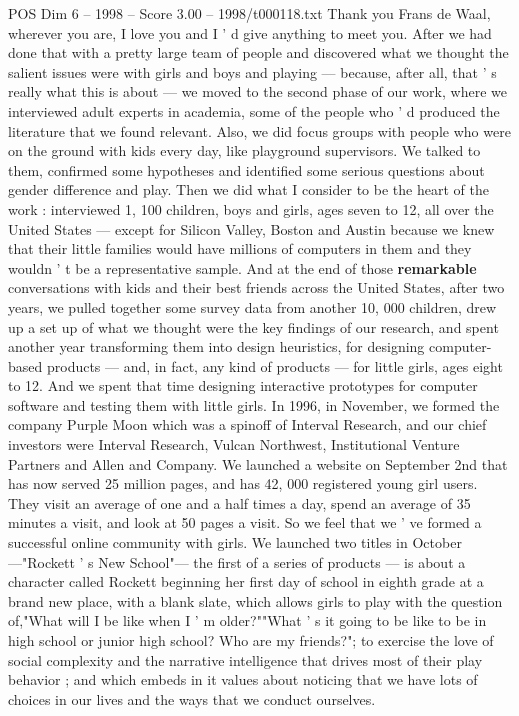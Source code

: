 \begin{textsample}{POS Dim 6 – 1998 – Score 3.00 – 1998/t000118.txt}
Thank you Frans de Waal, wherever you are, I love you and I ' d give anything to meet you.
After we had done that with a pretty large team of people and discovered what we thought the salient issues were with girls and boys and playing — because, after all, that ' s really what this is about — we moved to the second phase of our work, where we interviewed adult experts in academia, some of the people who ' d produced the literature that we found relevant.
Also, we did focus groups with people who were on the ground with kids every day, like playground supervisors.
We talked to them, confirmed some hypotheses and identified some serious questions about gender difference and play.
Then we did what I consider to be the heart of the work : interviewed 1, 100 children, boys and girls, ages seven to 12, all over the United States — except for Silicon Valley, Boston and Austin because we knew that their little families would have millions of computers in them and they wouldn ' t be a representative sample.
And at the end of those \textbf{remarkable} conversations with kids and their best friends across the United States, after two years, we pulled together some survey data from another 10, 000 children, drew up a set up of what we thought were the key findings of our research, and spent another year transforming them into design heuristics, for designing computer-based products — and, in fact, any kind of products — for little girls, ages eight to 12.
And we spent that time designing interactive prototypes for computer software and testing them with little girls.
In 1996, in November, we formed the company Purple Moon which was a spinoff of Interval Research, and our chief investors were Interval Research, Vulcan Northwest, Institutional Venture Partners and Allen and Company.
We launched a website on September 2nd that has now served 25 million pages, and has 42, 000 registered young girl users.
They visit an average of one and a half times a day, spend an average of 35 minutes a visit, and look at 50 pages a visit.
So we feel that we ' ve formed a successful online community with girls.
We launched two titles in October —"Rockett ' s New School"— the first of a series of products — is about a character called Rockett beginning her first day of school in eighth grade at a brand new place, with a blank slate, which allows girls to play with the question of,"What will I be like when I ' m older?""What ' s it going to be like to be in high school or junior high school?
Who are my friends?"; to exercise the love of social complexity and the narrative intelligence that drives most of their play behavior ; and which embeds in it values about noticing that we have lots of choices in our lives and the ways that we conduct ourselves.

\end{textsample}
